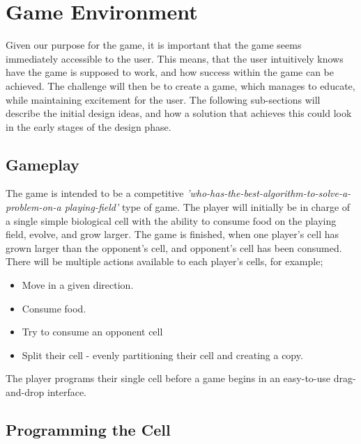 \section{Game Environment}
\label{sec:game_environment}

Given our purpose for the game, it is important that the game seems immediately accessible to the user. This means, that the user intuitively knows have the game is supposed to work, and how success within the game can be achieved.
The challenge will then be to create a game, which manages to educate, while maintaining excitement for the user.
The following sub-sections will describe the initial design ideas, and how a solution that achieves this could look in the early stages of the design phase.

\subsection{Gameplay}

The game is intended to be a competitive \textit{'who-has-the-best-algorithm-to-solve-a-problem-on-a playing-field'} type of game.
The player will initially be in charge of a single simple biological cell with the ability to consume food on the playing field, evolve, and grow larger. The game is finished, when one player's cell has grown larger than the opponent's cell, and opponent's cell has been consumed.
There will be multiple actions available to each player's cells, for example;
\begin{itemize}
	\item Move in a given direction.
	\item Consume food.
	\item Try to consume an opponent cell
	\item Split their cell - evenly partitioning their cell and creating a copy.
\end{itemize}
The player programs their single cell before a game begins in an easy-to-use drag-and-drop interface.

\subsection{Programming the Cell}

